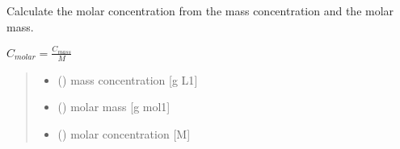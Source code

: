 \documentclass[letterpaper,10pt,english]{sphinxmanual}
\begin{document}
\begin{fulllineitems}
\label{\detokenize{03_absorption_coefficient:skinoptics.absorption_coefficient.Cmolar_from_Cmass}}
\pysigstartsignatures
{}
\pysigstopsignatures
\sphinxAtStartPar
Calculate the molar concentration from the mass concentration and the molar mass.

\sphinxAtStartPar
\(C_{molar} = \frac{C_{mass}}{M}\)
\begin{quote}\begin{description}
\begin{itemize}
\item {} 
\sphinxAtStartPar
{} () \textendash{} mass concentration {[}g L\sphinxhyphen{}1{]}

\item {} 
\sphinxAtStartPar
{} () \textendash{} molar mass {[}g mol\sphinxhyphen{}1{]}

\end{itemize}

\sphinxAtStartPar
\begin{itemize}
\item {} 
\sphinxAtStartPar
{} () \textendash{} molar concentration {[}M{]}

\end{itemize}


\end{description}\end{quote}

\end{fulllineitems}

\end{document}
